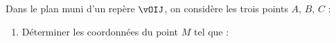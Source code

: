\begin{exo}{}
	Dans le plan muni d'un repère $\vOIJ$, on considère les trois points $A$, $B$, $C$ :
	\begin{enumerate}
		\item Déterminer les coordonnées du point $M$ tel que :
	\end{enumerate}
\end{exo}
